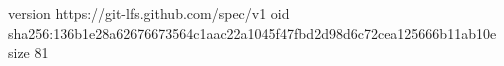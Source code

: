 version https://git-lfs.github.com/spec/v1
oid sha256:136b1e28a62676673564c1aac22a1045f47fbd2d98d6c72cea125666b11ab10e
size 81
